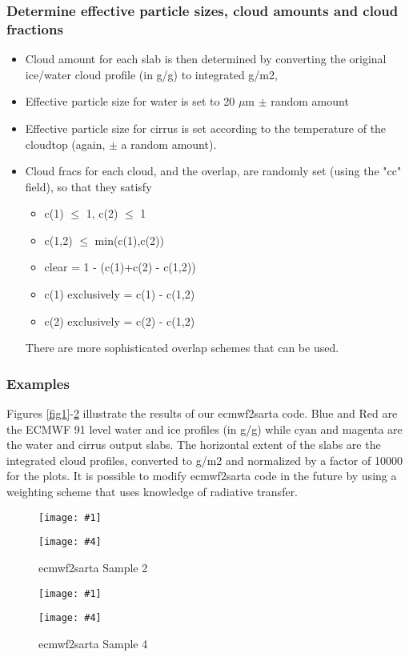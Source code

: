 \documentclass[11pt]{article}
\newcommand{\dfigure}[6]
{
\begin{figure}
  \begin{minipage}[t]{0.47\textwidth}
  \centering
  \texttt{[image: \#1]}
   \caption{#2}  \label{#3}
  \end{minipage}
  \hfil
  \begin{minipage}[t]{0.47\linewidth}
  \centering
  \texttt{[image: \#4]}
   \caption{#5}  \label{#6}
  \end{minipage}
\end{figure}
}
\begin{document}
\subsubsection{Determine effective particle sizes, cloud amounts and
  cloud fractions}
\begin{itemize}
\item Cloud amount for each slab is then determined by converting the
  original ice/water cloud profile (in g/g) to integrated g/m2,
\item Effective particle size for water is set to 20 $\mu$m $\pm$ random
  amount
\item Effective particle size for cirrus is set according to the
  temperature of the cloudtop (again, $\pm$ a random amount).
\item Cloud fracs for each cloud, and the overlap, are randomly set
  (using the "cc" field), so that they satisfy
  \begin{itemize}
  \item c(1) $\le$ 1, c(2) $\le$ 1
  \item c(1,2) $\le$ min(c(1),c(2))
  \item clear = 1 - (c(1)+c(2) - c(1,2))
  \item c(1) exclusively = c(1) - c(1,2)
  \item c(2) exclusively = c(2) - c(1,2)
  \end{itemize}
There are more sophisticated overlap schemes that can be used.
\end{itemize}

\subsubsection{Examples}
Figures \ref{fig1}-\ref{fig4} illustrate the results of our
\textsf{ecmwf2sarta} code. Blue and Red are the ECMWF 91 level water
and ice profiles (in g/g) while cyan and magenta are the water and
cirrus output slabs.  The horizontal extent of the slabs are
the integrated cloud profiles, converted to g/m2 and normalized by a
factor of 10000 for the plots. It is possible to modify
\textsf{ecmwf2sarta} code in the future by using a weighting scheme
that uses knowledge of radiative transfer.

\dfigure{Figs/clouds_profile10.eps}{\textsf{ecmwf2sarta} Sample
  1}{fig1}{Figs/clouds_profile100.eps}{\textsf{ecmwf2sarta} Sample
  2}{fig2} \dfigure{Figs/clouds_profile1000.eps}{\textsf{ecmwf2sarta}
  Sample 3}{fig3}{Figs/clouds_profile2000.eps}{\textsf{ecmwf2sarta}
  Sample 4}{fig4}
\end{document}
